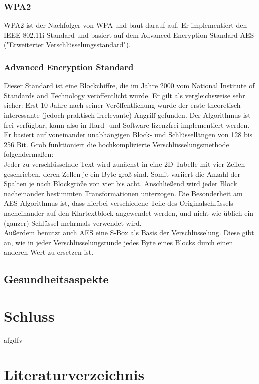 \documentclass[a4paper,13pt]{scrartcl}
\begin{document}
\subsubsection{WPA2}
WPA2 ist der Nachfolger von WPA und baut darauf auf. Er implementiert den IEEE 802.11i-Standard und basiert auf dem Advanced Encryption Standard AES ("Erweiterter Verschlüsselungsstandard").
\subsubsection{Advanced Encryption Standard}
Dieser Standard ist eine Blockchiffre, die im Jahre 2000 vom National Institute of Standards and Technology veröffentlicht wurde. Er gilt als vergleichsweise sehr sicher: Erst 10 Jahre nach seiner Veröffentlichung wurde der erste theoretisch interessante (jedoch praktisch irrelevante) Angriff gefunden. Der Algorithmus ist frei verfügbar, kann also in Hard- und Software lizenzfrei implementiert werden.\\
Er basiert auf voneinander unabhängigen Block- und Schlüssellängen von 128 bis 256 Bit. Grob funktioniert die hochkomplizierte Verschlüsselungsmethode folgendermaßen:\\
Jeder zu verschlüsselnde Text wird zunächst in eine 2D-Tabelle mit vier Zeilen geschrieben, deren Zellen je ein Byte groß sind. Somit variiert die Anzahl der Spalten je nach Blockgröße von vier bis acht. Anschließend wird jeder Block nacheinander bestimmten Transformationen unterzogen. Die Besonderheit am AES-Algorithmus ist, dass hierbei verschiedene Teile des Originalschlüssels nacheinander auf den Klartextblock angewendet werden, und nicht wie üblich ein (ganzer) Schlüssel mehrmals verwendet wird.\\
Außerdem benutzt auch AES eine S-Box als Basis der Verschlüsselung. Diese gibt an, wie in jeder Verschlüsselungsrunde jedes Byte eines Blocks durch einen anderen Wert zu ersetzen ist.

\subsection{Gesundheitsaspekte}


\section{Schluss}
afgdfv

\clearpage

\section{Literaturverzeichnis}
\end{document}
